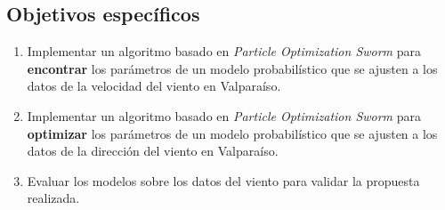\subsection{Objetivos específicos}
\begin{enumerate}
    \item Implementar un algoritmo basado en \emph{Particle Optimization Sworm} para \textbf{encontrar} los parámetros de un modelo probabilístico que se ajusten a los datos de la velocidad del viento en Valparaíso. 
    \item Implementar un algoritmo basado en \emph{Particle Optimization Sworm} para \textbf{optimizar} los parámetros de un modelo probabilístico que se ajusten a los datos de la dirección del viento en Valparaíso.
    \item Evaluar los modelos sobre los datos del viento para validar la propuesta realizada.
\end{enumerate}

